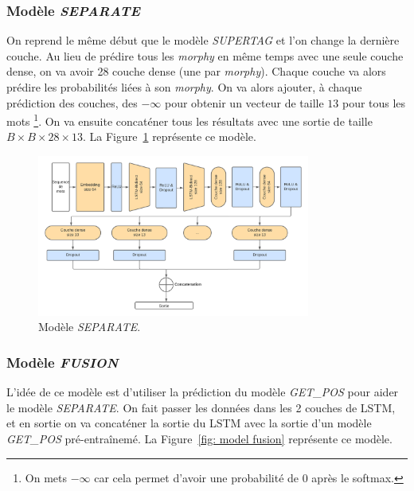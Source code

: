 \documentclass[a4paper]{article}
\begin{document}
\subsubsection{Modèle \textit{SEPARATE}}

On reprend le même début que le modèle \textit{SUPERTAG} et l'on change la dernière couche. Au lieu de prédire tous les 
\textit{morphy} en même temps avec une seule couche dense, on va avoir 28 couche dense (une par \textit{morphy}). Chaque couche
va alors prédire les probabilités liées à son \textit{morphy}. On va alors ajouter, à chaque prédiction des couches, des $- \infty$
pour obtenir un vecteur de taille $13$ pour tous les mots
\footnote{On mets $-\infty$ car cela permet d'avoir une probabilité de $0$ après le softmax.}.
On va ensuite concaténer tous les résultats avec une sortie de 
taille $B \times B \times 28 \times 13$. La Figure~\ref{fig: model separate} représente ce modèle.

\begin{figure}[H]
    \centering
    \includegraphics[width=0.8\textwidth]{get_morphy_separate.png}
    \caption{Modèle \textit{SEPARATE}.}
    \label{fig: model separate}
\end{figure}

\subsubsection{Modèle \textit{FUSION}}

L'idée de ce modèle est d'utiliser la prédiction du modèle \textit{GET\_POS} pour aider le modèle \textit{SEPARATE}.
On fait passer les données dans les 2 couches de LSTM, et en sortie on va concaténer la sortie du LSTM avec la sortie
d'un modèle \textit{GET\_POS} pré-entraînemé.
La Figure~\ref{fig: model fusion} représente ce modèle.
\end{document}
